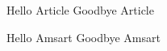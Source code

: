 \documentclass[%
defaults,%
]{myclass}
\begin{document}
\mymaketitle

\newpage

Hello Article
\else
Goodbye Article
\fi

\newpage

Hello Amsart
\else
Goodbye Amsart
\fi
\end{document}
